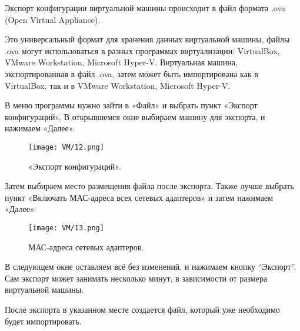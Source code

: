 Экспорт конфигурации виртуальной машины происходит в файл формата .ova (Open Virtual Appliance).

Это универсальный формат для хранения данных виртуальной машины, файлы .ova могут использоваться в разных программах виртуализации: VirtualBox, VMware Workstation, Microsoft Hyper-V. Виртуальная машина, экспортированная в файл .ova, затем может быть импортирована как в VirtualBox, так и в VMware Workstation, Microsoft Hyper-V.

В меню программы нужно зайти в «Файл» и выбрать пункт «Экспорт конфигураций». В открывшемся окне выбираем машину для экспорта, и нажимаем «Далее».

\begin{figure}[h]
		\centering
		\texttt{[image: VM/12.png]}
\caption{«Экспорт конфигураций».}
\label{ris:image}

\end{figure}

Затем выбираем место размещения файла после экспорта. Также лучше выбрать пункт «Включать МАС-адреса всех сетевых адаптеров» и затем нажимаем «Далее». 

\begin{figure}[h]
		\centering
		\texttt{[image: VM/13.png]}
\caption{МАС-адреса сетевых адаптеров.}
\label{ris:image}
\end{figure}

В следующем окне оставляем всё без изменений, и нажимаем кнопку “Экспорт”. Сам экспорт может занимать несколько минут, в зависимости от размера виртуальной машины. 

После экспорта в указанном месте создается файл, который уже необходимо будет импортировать.